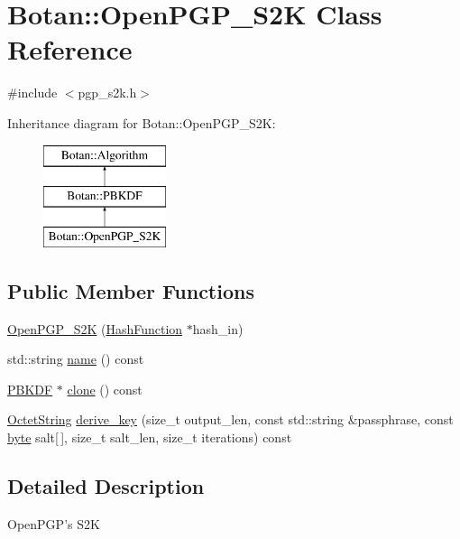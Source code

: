 \hypertarget{classBotan_1_1OpenPGP__S2K}{\section{Botan\-:\-:Open\-P\-G\-P\-\_\-\-S2\-K Class Reference}
\label{classBotan_1_1OpenPGP__S2K}
}


{\ttfamily \#include $<$pgp\-\_\-s2k.\-h$>$}

Inheritance diagram for Botan\-:\-:Open\-P\-G\-P\-\_\-\-S2\-K\-:\begin{figure}[H]
\begin{center}
\leavevmode
\includegraphics[height=3.000000cm]{classBotan_1_1OpenPGP__S2K}
\end{center}
\end{figure}
\subsection*{Public Member Functions}
\begin{DoxyCompactItemize}
\item 
\hyperlink{classBotan_1_1OpenPGP__S2K_a332ec66e433c4a4d606cb7656f0de94e}{Open\-P\-G\-P\-\_\-\-S2\-K} (\hyperlink{classBotan_1_1HashFunction}{Hash\-Function} $\ast$hash\-\_\-in)
\item 
std\-::string \hyperlink{classBotan_1_1OpenPGP__S2K_ab0990558ddcbdd8f3dea1646346c7051}{name} () const 
\item 
\hyperlink{classBotan_1_1PBKDF}{P\-B\-K\-D\-F} $\ast$ \hyperlink{classBotan_1_1OpenPGP__S2K_a726246049a5e4291eb0235a56731a75f}{clone} () const 
\item 
\hyperlink{classBotan_1_1OctetString}{Octet\-String} \hyperlink{classBotan_1_1OpenPGP__S2K_ae0c2428844165631e291cb2a03d89c4a}{derive\-\_\-key} (size\-\_\-t output\-\_\-len, const std\-::string \&passphrase, const \hyperlink{namespaceBotan_a7d793989d801281df48c6b19616b8b84}{byte} salt\mbox{[}$\,$\mbox{]}, size\-\_\-t salt\-\_\-len, size\-\_\-t iterations) const 
\end{DoxyCompactItemize}


\subsection{Detailed Description}
Open\-P\-G\-P's S2\-K 

